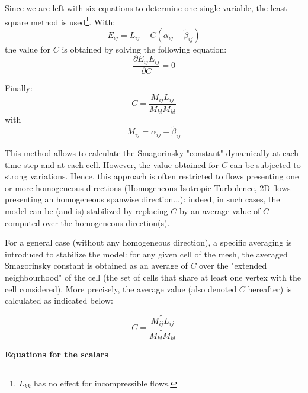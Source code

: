 Since we are left with six equations to determine one single variable, the
least square method is used\footnote{$L_{kk}$ has no effect for
incompressible flows.}. With:
\[
E_{ij} = L_{ij}-C(\alpha_{ij} - \widetilde{\beta}_{ij})
\]
the value for $C$ is obtained by solving the following equation:
\[
\frac {\partial E_{ij}E_{ij}}{\partial C} = 0
\]

Finally:
\[
C = \frac{M_{ij}L_{ij}} {M_{kl}M_{kl}}
\]
with
\[
M_{ij} = \alpha_{ij} - \widetilde{\beta}_{ij}
\]

This method allows to calculate the Smagorinsky "constant" dynamically at
each time step and at each cell. However, the value obtained for $C$ can be
subjected to strong variations. Hence, this approach is often restricted to
flows presenting one or more homogeneous directions (Homogeneous Isotropic
Turbulence, 2D flows presenting an homogeneous spanwise direction...):
indeed, in such cases, the model can be (and is) stabilized by replacing $C$
by an average value of $C$ computed over the homogeneous direction(s).

For a general case (without any homogeneous direction), a specific averaging
is introduced to stabilize the model: for any given cell of the mesh, the
averaged Smagorinsky constant is obtained as an average of $C$ over the
"extended neighbourhood" of the cell (the set of cells that share at least
one vertex with the cell considered). More precisely, the average value
(also denoted $C$ hereafter) is calculated as indicated below:

\[
C = \frac{\widetilde{M_{ij}L_{ij}}} {\widetilde{M_{kl}M_{kl}}}
\]

\clearpage \textbf{Equations for the scalars}

